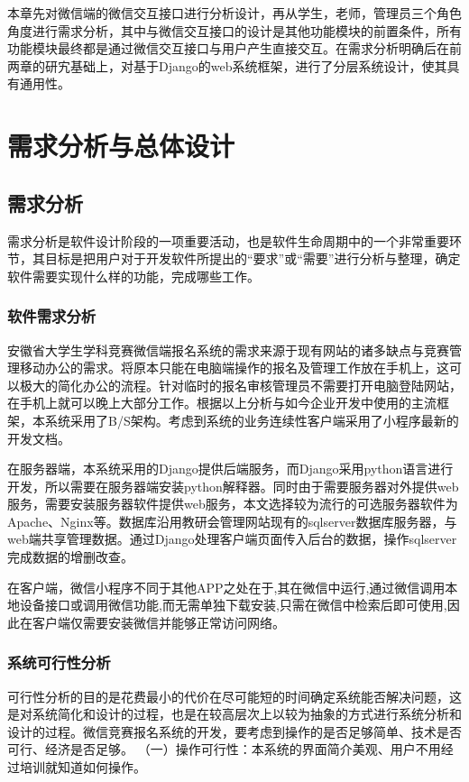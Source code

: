 \documentclass[a4paper]{ltxdoc}
\begin{document}
{		本章先对微信端的微信交互接口进行分析设计，再从学生，老师，管理员三个角色角度进行需求分析，其中与微信交互接口的设计是其他功能模块的前置条件，所有功能模块最终都是通过微信交互接口与用户产生直接交互。在需求分析明确后在前两章的研宄基础上，对基于Django的web系统框架，进行了分层系统设计，使其具有通用性。
		
		\section{需求分析与总体设计}
		
		\subsection{需求分析}
		需求分析是软件设计阶段的一项重要活动，也是软件生命周期中的一个非常重要环节，其目标是把用户对于开发软件所提出的“要求”或“需要”进行分析与整理，确定软件需要实现什么样的功能，完成哪些工作。
		
		\subsubsection{软件需求分析}
		安徽省大学生学科竞赛微信端报名系统的需求来源于现有网站的诸多缺点与竞赛管理移动办公的需求。将原本只能在电脑端操作的报名及管理工作放在手机上，这可以极大的简化办公的流程。针对临时的报名审核管理员不需要打开电脑登陆网站，在手机上就可以晚上大部分工作。根据以上分析与如今企业开发中使用的主流框架，本系统采用了B/S架构。考虑到系统的业务连续性客户端采用了小程序最新的开发文档。
		
		在服务器端，本系统采用的Django提供后端服务，而Django采用python语言进行开发，所以需要在服务器端安装python解释器。同时由于需要服务器对外提供web服务，需要安装服务器软件提供web服务，本文选择较为流行的可选服务器软件为Apache、Nginx等。数据库沿用教研会管理网站现有的sqlserver数据库服务器，与web端共享管理数据。通过Django处理客户端页面传入后台的数据，操作sqlserver完成数据的增删改查。
		
		在客户端，微信小程序不同于其他APP之处在于,其在微信中运行,通过微信调用本地设备接口或调用微信功能,而无需单独下载安装,只需在微信中检索后即可使用,因此在客户端仅需要安装微信并能够正常访问网络。
		
		\subsubsection{系统可行性分析}
		可行性分析的目的是花费最小的代价在尽可能短的时间确定系统能否解决问题，这是对系统简化和设计的过程，也是在较高层次上以较为抽象的方式进行系统分析和设计的过程。微信竞赛报名系统的开发，要考虑到操作的是否足够简单、技术是否可行、经济是否足够。
		（一）操作可行性：本系统的界面简介美观、用户不用经过培训就知道如何操作。
		
}
\end{document}
